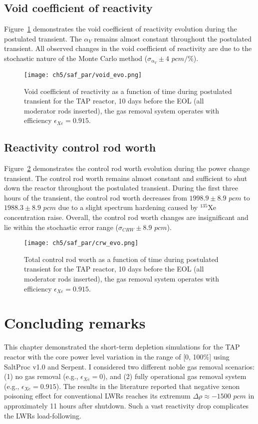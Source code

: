 \subsection{Void coefficient of reactivity}
Figure~\ref{fig:lf-tap-void-evo} demonstrates the void coefficient of 
reactivity evolution during the postulated transient. 
The $\alpha_V$ remains almost constant throughout the postulated transient. 
All observed changes in the void coefficient of reactivity are due to the
stochastic nature of the Monte Carlo method ($\sigma_{\alpha_V}\pm4$ $pcm/$\%).
\begin{figure}[htp!] %
	\centering
	\texttt{[image: ch5/saf\_par/void\_evo.png]}
	\caption{Void coefficient of reactivity as a function of time during 
	postulated transient for the \gls{TAP} reactor, 10 days before the 
	\gls{EOL} (all moderator rods inserted), the gas removal system operates 
	with efficiency $\epsilon_{Xe}=0.915$.}
	\label{fig:lf-tap-void-evo}
\end{figure}

\subsection{Reactivity control rod worth}
Figure~\ref{fig:lf-tap-crw-evo} demonstrates the control rod worth evolution 
during the power change transient. The control rod worth remains almost 
constant and sufficient to shut down the reactor throughout the postulated 
transient. During the first three hours of the transient, the control rod 
worth decreases from $1998.9\pm8.9$ $pcm$ to $1988.3\pm8.9$ $pcm$ due to a 
slight spectrum hardening caused by $^{135}$Xe concentration raise. Overall, 
the control rod worth changes are insignificant and lie within the 
stochastic error range ($\sigma_{CRW}\pm8.9$ $pcm$).
\begin{figure}[htp!] %
	\centering
	\texttt{[image: ch5/saf\_par/crw\_evo.png]}
	\caption{Total control rod worth as a function of time during postulated 
	transient for the \gls{TAP} reactor, 10 days before the \gls{EOL} (all 
	moderator rods inserted), the gas removal system operates with efficiency 
	$\epsilon_{Xe}=0.915$.}
	\label{fig:lf-tap-crw-evo}
\end{figure}



\section{Concluding remarks}
This chapter demonstrated the short-term depletion simulations for the 
\gls{TAP} reactor with the core power level variation in the range of [0, 
100\%] using SaltProc v1.0 and Serpent. I considered two different noble gas 
removal scenarios: (1) no gas removal (e.g., $\epsilon_{Xe}=0$), 
and (2) fully operational gas removal system (e.g., $\epsilon_{Xe}=0.915$). 
The results in the literature reported that negative xenon poisoning effect 
for conventional \glspl{LWR} reaches its extremum $\Delta\rho\approx-1500$ 
$pcm$ in approximately 11 hours after shutdown. Such a vast reactivity drop 
complicates the \glspl{LWR} load-following.

